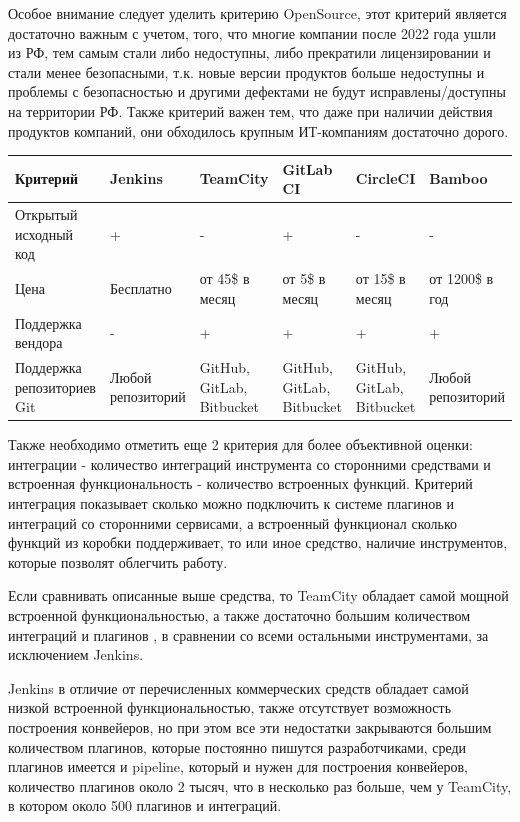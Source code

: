 Особое внимание следует уделить критерию OpenSource, этот критерий является достаточно важным с учетом, того, что многие компании после 2022 года ушли из РФ, тем самым стали либо недоступны, либо прекратили лицензировании и стали менее безопасными, т.к. новые версии продуктов больше недоступны и проблемы с безопасностью и другими дефектами не будут исправлены/доступны на территории РФ. Также критерий важен тем, что даже при наличии действия продуктов компаний, они обходилось крупным ИТ-компаниям достаточно дорого.

\begin{table}
    \centering
    \begin{tabular}{|p{3cm}|p{2cm}|p{2cm}|p{2cm}|p{2cm}|p{2cm}|}
    \hline
        Критерий & Jenkins & TeamCity & GitLab CI & CircleCI & Bamboo \\ \hline
        Открытый исходный код & + & - & + & - & - \\ \hline
        Цена & Бесплатно & от 45\$ в месяц & от 5\$ в месяц & от 15\$ в месяц & от 1200\$ в год \\ \hline
        Поддержка вендора & - & + & + &+ & + \\ \hline
        Поддержка репозиториев Git & Любой репозиторий & GitHub, GitLab, Bitbucket & GitHub, GitLab, Bitbucket  & GitHub, GitLab, Bitbucket & Любой репозиторий  \\ \hline

    \end{tabular}
\end{table}	

Также необходимо отметить еще 2 критерия для более объективной оценки: интеграции - количество интеграций инструмента со сторонними средствами и встроенная функциональность - количество встроенных функций.
Критерий интеграция показывает сколько можно подключить к системе плагинов и интеграций со сторонними сервисами, а встроенный функционал сколько функций из коробки поддерживает, то или иное средство, наличие инструментов, которые позволят облегчить работу.

Если сравнивать описанные выше средства, то TeamCity обладает самой мощной встроенной функциональностью, а также достаточно большим количеством интеграций и плагинов \cite{cianalyze}, в сравнении со всеми остальными инструментами, за исключением Jenkins.

Jenkins в отличие от перечисленных коммерческих средств обладает самой низкой встроенной функциональностью, также отсутствует возможность построения конвейеров, но при этом все эти недостатки закрываются большим количеством плагинов, которые постоянно пишутся разработчиками, среди плагинов имеется и pipeline, который и нужен для построения конвейеров, количество плагинов около 2 тысяч, что в несколько раз больше, чем у TeamCity, в котором около 500 плагинов и интеграций.

